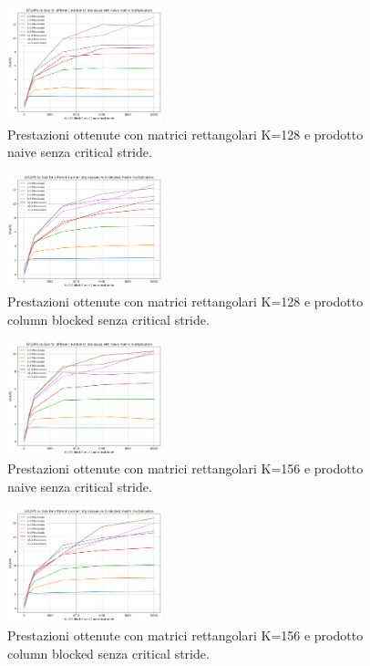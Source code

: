 \documentclass[conference]{IEEEtran}
\begin{document}
\begin{figure}[H]
    \centering
    \includegraphics[width=0.4\textwidth]{resources/rect_k128_naive_nocrit.png}
    \caption{Prestazioni ottenute con matrici rettangolari K=128 e prodotto naive senza critical stride.}
    \label{fig:rect_k128_matrix_naive_nocrit}
\end{figure}
\begin{figure}[H]
    \centering
    \includegraphics[width=0.4\textwidth]{resources/rect_k128_blocked_nocrit.png}
    \caption{Prestazioni ottenute con matrici rettangolari K=128 e prodotto column blocked senza critical stride.}
    \label{fig:rect_k128_matrix_blocked_nocrit}
\end{figure}
\begin{figure}[H]
    \centering
    \includegraphics[width=0.4\textwidth]{resources/rect_k156_naive_nocrit.png}
    \caption{Prestazioni ottenute con matrici rettangolari K=156 e prodotto naive senza critical stride.}
    \label{fig:rect_k156_matrix_naive_nocrit}
\end{figure}
\begin{figure}[H]
    \centering
    \includegraphics[width=0.4\textwidth]{resources/rect_k156_blocked_nocrit.png}
    \caption{Prestazioni ottenute con matrici rettangolari K=156 e prodotto column blocked senza critical stride.}
    \label{fig:rect_k156_matrix_blocked_nocrit}
\end{figure}
\end{document}
